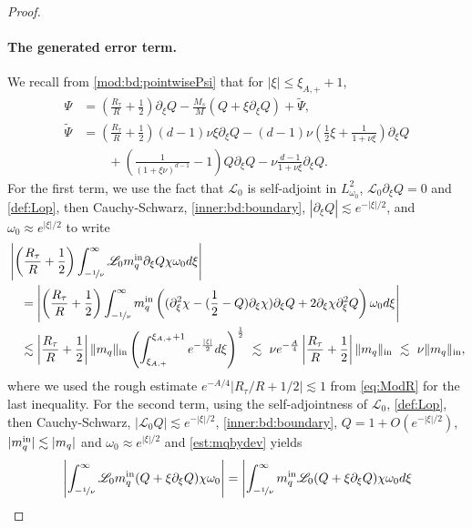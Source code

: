 \documentclass[11pt]{aims}
\theoremstyle{definition}
\newcommand{\Ls}{\mathscr{L}}
\newcommand{\pa}{\partial}
\newcommand{\inn}{\textup{in}}
\newcommand{\intb}{\int_{-\nicefrac{1}{\nu}}^\infty}
\numberwithin{equation}{section}
\begin{document}
\begin{proof}
\paragraph{The generated error term.} We recall from \eqref{mod:bd:pointwisePsi} that for $|\xi|\leq \xi_{A,+}+1$,
\begin{align}  \label{inner:id:Psi}
\Psi &=  \left(\frac{R_\tau}{R}+\frac{1}{2} \right)\pa_\xi Q-\frac{M_s}{M}\left( Q+\xi \pa_\xi Q\right) +\tilde \Psi,\\
\nonumber \tilde \Psi &= \left(\frac{R_\tau}{R}+\frac{1}{2} \right) (d-1)\nu \xi \pa_\xi Q  -(d-1)\nu \left(\frac 12 \xi +\frac{1}{1+\nu \xi} \right) \pa_\xi  Q \\
&\qquad +\left(\frac{1}{(1+\xi\nu)^{d-1}}-1 \right) Q \pa_\xi  Q -\nu \frac{d-1}{1+\nu\xi}\pa_\xi  Q .
\end{align}
For the first term, we use the fact that $\Ls_0$ is self-adjoint in $L^2_{\omega_0}$, $\Ls_0 \pa_\xi Q = 0$ and \eqref{def:Lop}, then Cauchy-Schwarz, \eqref{inner:bd:boundary}, $|\pa_\xi Q|\lesssim e^{-|\xi|/2}$, and $\omega_0\approx e^{|\xi|/2}$ to write
\begin{align}
\nonumber &\left|\left( \frac{R_\tau}{R} + \frac{1}{2} \right)\int_{-\nicefrac{1}{\nu}}^\infty \Ls_0 m_q^\inn \pa_\xi Q \chi \omega_0 d\xi \right| \\
\label{inner:bd:inter11} &\quad =\left|\left( \frac{R_\tau}{R} + \frac{1}{2} \right)\int_{-\nicefrac{1}{\nu}}^\infty m_q^\inn \left((\pa_\xi^2\chi-(\frac 12 -Q)\pa_\xi \chi)\pa_\xi Q+2\pa_\xi \chi \pa_\xi^2 Q\right)\omega_0 d\xi \right|\\
\nonumber &\quad  \lesssim \left|\frac{R_\tau}{R} + \frac{1}{2} \right| \|m_q\|_\inn  \left(\int_{\xi_{A,+}}^{\xi_{A,+}+1} e^{-\frac{|\xi|}{2}}d\xi \right)^\frac{1}{2} \ \lesssim \ \nu e^{-\frac A4} \left|\frac{R_\tau}{R} + \frac{1}{2} \right| \|m_q\|_\inn \ \lesssim \ \nu  \|m_q\|_\inn,
\end{align}
where we used the rough estimate $e^{-A/4}|R_\tau/R+1/2|\lesssim 1$ from \eqref{eq:ModR} for the last inequality. For the second term, using the self-adjointness of $\Ls_0$, \eqref{def:Lop}, then Cauchy-Schwarz, $|\Ls_0 Q|\lesssim e^{-|\xi|/2}$, \eqref{inner:bd:boundary}, $Q=1+O(e^{-|\xi|/2})$, $|m_q^\inn|\lesssim |m_q|$ and $\omega_0\approx e^{|\xi|/2}$ and \eqref{est:mqbydev} yields
\begin{align*}
& \left|  \intb  \Ls_0 m_q^\inn (Q+\xi\pa_\xi Q) \chi \omega_0 \right| = \Biggl| \intb  m_q^\inn \Ls_0(Q+\xi\pa_\xi Q) \chi \omega_0d\xi \\

\end{align*}
\end{proof}
\end{document}
